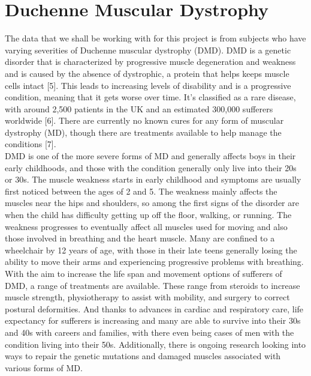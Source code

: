 \documentclass[12pt,twoside]{report}
\begin{document}
\section{Duchenne Muscular Dystrophy}

\quad The data that we shall be working with for this project is from subjects who have varying severities of Duchenne muscular dystrophy (DMD). DMD is a genetic disorder that is characterized by progressive muscle degeneration and weakness and is caused by the absence of dystrophic, a protein that helps keeps muscle cells intact [5]. This leads to increasing levels of disability and is a progressive condition, meaning that it gets worse over time. It’s classified as a rare disease, with around 2,500 patients in the UK and an estimated 300,000 sufferers worldwide [6]. There are currently no known cures for any form of muscular dystrophy (MD), though there are treatments available to help manage the conditions [7].\\

\quad DMD is one of the more severe forms of MD and generally affects boys in their early childhoods, and those with the condition generally only live into their 20s or 30s. The muscle weakness starts in early childhood and symptoms are usually first noticed between the ages of 2 and 5. The weakness mainly affects the muscles near the hips and shoulders, so among the first signs of the disorder are when the child has difficulty getting up off the floor, walking, or running. The weakness progresses to eventually affect all muscles used for moving and also those involved in breathing and the heart muscle. Many are confined to a wheelchair by 12 years of age, with those in their late teens generally losing the ability to move their arms and experiencing progressive problems with breathing.\\

\quad With the aim to increase the life span and movement options of sufferers of DMD, a range of treatments are available. These range from steroids to increase muscle strength, physiotherapy to assist with mobility, and surgery to correct postural deformities. And thanks to advances in cardiac and respiratory care, life expectancy for sufferers is increasing and many are able to survive into their 30s and 40s with careers and families, with there even being cases of men with the condition living into their 50s. Additionally, there is ongoing research looking into ways to repair the genetic mutations and damaged muscles associated with various forms of MD.\\
\end{document}
